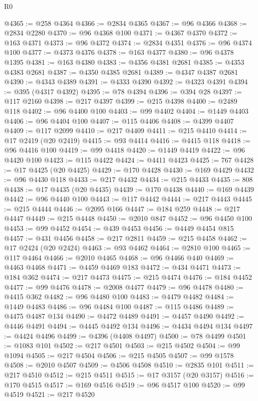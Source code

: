 \begin{lexlean}{R0}
\begin{coremodule}
@4365 := @258 @4364
@4366 := @2834 @4365
@4367 := @96 @4366
@4368 := @2834 @2280
@4370 := @96 @4368 @100
@4371 := @4367 @4370
@4372 := @163 @4371
@4373 := @96 @4372
@4374 := @2834 @4351
@4376 := @96 @4374 @100
@4377 := @4373 @4376
@4378 := @163 @4377
@4380 := @96 @4378 @1395
@4381 := @163 @4380
@4383 := @4356 @4381 @2681
@4385 := @4353 @4383 @2681
@4387 := @4350 @4385 @2681
@4389 := @4347 @4387 @2681
@4390 := @4343 @4389
@4391 := @4333 @4390
@4392 := @4323 @4391
@4394 := @395 (@4317 @4392)
@4395 := @78 @4394
@4396 := @394 @28
@4397 := @117 @2160
@4398 := @217 @4397
@4399 := @215 @4398
@4400 := @2489 @118
@4402 := @96 @4400 @100
@4403 := @99 @4402
@4404 := @1449 @4403
@4406 := @96 @4404 @100
@4407 := @115 @4406
@4408 := @4399 @4407
@4409 := @117 @2099
@4410 := @217 @4409
@4411 := @215 @4410
@4414 := @17 @2419 (@20 @2419)
@4415 := @93 @4414
@4416 := @4415 @118
@4418 := @96 @4416 @100
@4419 := @99 @4418
@4420 := @1449 @4419
@4422 := @96 @4420 @100
@4423 := @115 @4422
@4424 := @4411 @4423
@4425 := 767
@4428 := @17 @4425 (@20 @4425)
@4429 := @170 @4428
@4430 := @169 @4429
@4432 := @96 @4430 @118
@4433 := @217 @4432
@4434 := @215 @4433
@4435 := 808
@4438 := @17 @4435 (@20 @4435)
@4439 := @170 @4438
@4440 := @169 @4439
@4442 := @96 @4440 @100
@4443 := @117 @4442
@4444 := @217 @4443
@4445 := @215 @4444
@4446 := @2095 @166
@4447 := @184 @259
@4448 := @217 @4447
@4449 := @215 @4448
@4450 := @2010 @847
@4452 := @96 @4450 @100
@4453 := @99 @4452
@4454 := @439 @4453
@4456 := @4449 @4454 @815
@4457 := @431 @4456
@4458 := @217 @2811
@4459 := @215 @4458
@4462 := @17 @2424 (@20 @2424)
@4463 := @93 @4462
@4464 := @2810 @100
@4465 := @117 @4464
@4466 := @2010 @4465
@4468 := @96 @4466 @440
@4469 := @4463 @4468
@4471 := @4459 @4469 @183
@4472 := @434 @4471
@4473 := @184 @362
@4474 := @217 @4473
@4475 := @215 @4474
@4476 := @184 @4452
@4477 := @99 @4476
@4478 := @2008 @4477
@4479 := @96 @4478
@4480 := @4415 @362
@4482 := @96 @4480 @100
@4483 := @4479 @4482
@4484 := @1449 @4483
@4486 := @96 @4484 @100
@4487 := @115 @4486
@4489 := @4475 @4487 @134
@4490 := @4472 @4489
@4491 := @4457 @4490
@4492 := @4446 @4491
@4494 := @4445 @4492 @134
@4496 := @4434 @4494 @134
@4497 := @4424 @4496
@4499 := @4396 (@4408 @4497)
@4500 := @78 @4499
@4501 := @1083 @101
@4502 := @217 @4501
@4503 := @215 @4502
@4504 := @99 @1094
@4505 := @217 @4504
@4506 := @215 @4505
@4507 := @99 @1578
@4508 := @2010 @4507
@4509 := @4506 @4508
@4510 := @2835 @101
@4511 := @217 @4510
@4512 := @215 @4511
@4515 := @17 @3157 (@20 @3157)
@4516 := @170 @4515
@4517 := @169 @4516
@4519 := @96 @4517 @100
@4520 := @99 @4519
@4521 := @217 @4520

\end{coremodule}
\end{lexlean}
